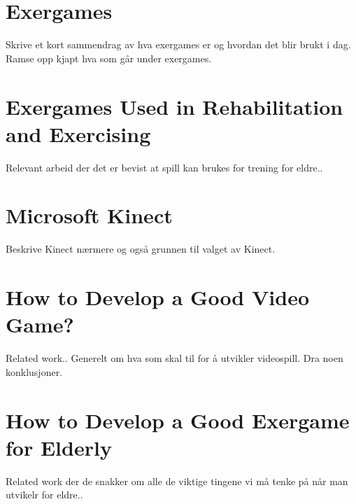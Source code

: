 \section{Exergames}
Skrive et kort sammendrag av hva exergames er og hvordan det blir brukt i dag. Ramse opp kjapt hva som går under exergames. 
\section{Exergames Used in Rehabilitation and Exercising}
Relevant arbeid der det er bevist at spill kan brukes for trening for eldre.. 
\section{Microsoft Kinect}
Beskrive Kinect nærmere og også grunnen til valget av Kinect. 
\section{How to Develop a Good Video Game?}
Related work.. Generelt om hva som skal til for å utvikler videospill. Dra noen konklusjoner.
\section{How to Develop a Good Exergame for Elderly}
Related work der de snakker om alle de viktige tingene vi må tenke på når man utvikelr for eldre..

